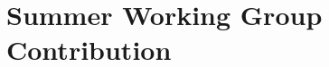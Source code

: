 \documentclass[../../main.tex]{subfiles}
\begin{document}
%

\begin{flushleft}

\end{flushleft}

\section{Summer Working Group Contribution}

%

\begin{flushleft}

\end{flushleft}
\end{document}
